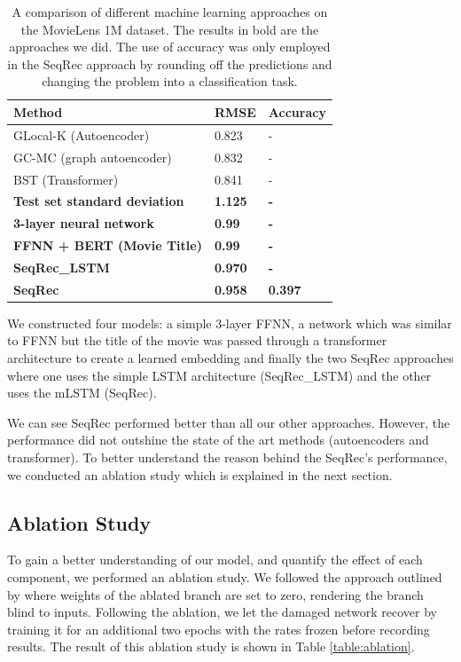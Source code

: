 \documentclass{bioinfo}
\begin{document}
\begin{table}[h]
\centering
\begin{tabular}{|l|l|l|}
\hline
\textbf{Method} &  \textbf{RMSE} & \textbf{Accuracy} \\ \hline
GLocal-K (Autoencoder) & 0.823 & - \\ \hline
GC-MC (graph autoencoder) & 0.832 & - \\ \hline
BST (Transformer) & 0.841 & - \\ \hline
\textbf{Test set standard deviation} & \textbf{1.125} & \textbf{-} \\ \hline
\textbf{3-layer neural network} & \textbf{0.99} & \textbf{-} \\ \hline
\textbf{FFNN + BERT (Movie Title)} & \textbf{0.99} & \textbf{-} \\ \hline
\textbf{SeqRec\_LSTM} & \textbf{0.970} & \textbf{-} \\ \hline
\textbf{SeqRec} & \textbf{0.958} & \textbf{0.397} \\ \hline
\end{tabular}
\caption{A comparison of different machine learning approaches on the MovieLens 1M dataset. The results in bold are the approaches we did. The use of accuracy was only employed in the SeqRec approach by rounding off the predictions and changing the problem into a classification task.}
\label{tab:results}
\end{table}

We constructed four models: a simple 3-layer FFNN, a network which was similar to FFNN but the title of the movie was passed through a transformer architecture to create a learned embedding and finally the two SeqRec approaches where one uses the simple LSTM architecture (SeqRec\_LSTM) and the other uses the mLSTM (SeqRec).

We can see SeqRec performed better than all our other approaches. However, the performance did not outshine the state of the art methods (autoencoders and transformer). To better understand the reason behind the SeqRec's performance, we conducted an ablation study which is explained in the next section.

\subsection{Ablation Study}
To gain a better understanding of our model, and quantify the effect of each component, we performed an ablation study. We followed the approach outlined by \cite{meyes2019ablation} where weights of the ablated branch are set to zero, rendering the branch blind to inputs. Following the ablation, we let the damaged network recover by training it for an additional two epochs with the rates frozen before recording results. The result of this ablation study is shown in Table \ref{table:ablation}.
\end{document}
